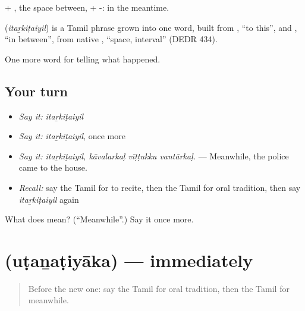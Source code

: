  + , the space between, + -: in the meantime.

\begin{cousinweb}
\textbf{} (\emph{itaṟkiṭaiyil}) is a Tamil phrase grown into one word, built from , \textquotedblleft{}to this\textquotedblright{}, and , \textquotedblleft{}in between\textquotedblright{}, from native , \textquotedblleft{}space, interval\textquotedblright{} (DEDR 434).
\end{cousinweb}

\begin{grammarlens}[title={What you've built}]
One more word for telling what happened.
\end{grammarlens}

\subsection*{Your turn}
\begin{itemize}
\raggedright
  \item \emph{Say it:} \emph{itaṟkiṭaiyil}
  \item \emph{Say it:} \emph{itaṟkiṭaiyil}, once more
  \item \emph{Say it:} \emph{itaṟkiṭaiyil, kāvalarkaḷ vīṭṭukku vantārkaḷ.} — Meanwhile, the police came to the house.
  \item \emph{Recall:} say the Tamil for to recite, then the Tamil for oral tradition, then say \emph{itaṟkiṭaiyil} again
\end{itemize}

\begin{tcolorbox}[breakable,colback=teal!4,colframe=teal!35!black,title={Before you move on}]
What does  mean? (\textquotedblleft{}Meanwhile\textquotedblright{}.) Say it once more.
\end{tcolorbox}
\section[\texorpdfstring{\ta{உடனடியாக} (uṭaṉaṭiyāka)}{உடனடியாக (uṭaṉaṭiyāka)}]{ (uṭaṉaṭiyāka) — immediately}

\label{lesson:TA-C313-utanatiyaka}



\begin{quote}
Before the new one: say the Tamil for oral tradition, then the Tamil for meanwhile.
\end{quote}

